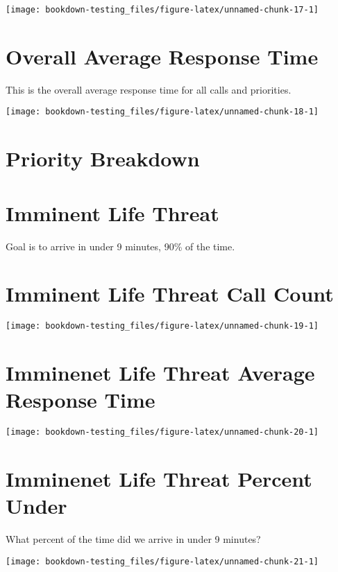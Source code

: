 \documentclass[]{book}
\begin{document}
\texttt{[image: bookdown-testing\_files/figure-latex/unnamed-chunk-17-1]}

\hypertarget{emsoverallavgresp}{%
\section{Overall Average Response Time}\label{emsoverallavgresp}}

This is the overall average response time for all calls and priorities.

\texttt{[image: bookdown-testing\_files/figure-latex/unnamed-chunk-18-1]}

\hypertarget{priority-breakdown-1}{%
\section*{Priority Breakdown}\label{priority-breakdown-1}}

\hypertarget{imminent-life-threat}{%
\section{Imminent Life Threat}\label{imminent-life-threat}}

Goal is to arrive in under 9 minutes, 90\% of the time.

\hypertarget{emsimcallcount}{%
\section{Imminent Life Threat Call Count}\label{emsimcallcount}}

\texttt{[image: bookdown-testing\_files/figure-latex/unnamed-chunk-19-1]}

\hypertarget{emsimavgresp}{%
\section{Imminenet Life Threat Average Response Time}\label{emsimavgresp}}

\texttt{[image: bookdown-testing\_files/figure-latex/unnamed-chunk-20-1]}

\hypertarget{emsimpercunder}{%
\section{Imminenet Life Threat Percent Under}\label{emsimpercunder}}

What percent of the time did we arrive in under 9 minutes?

\texttt{[image: bookdown-testing\_files/figure-latex/unnamed-chunk-21-1]}


\end{document}
